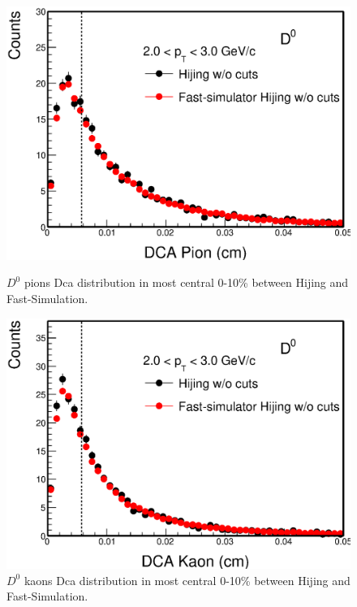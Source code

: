 \begin{figure}[htbp]
\begin{minipage}[htbp]{0.52\linewidth}
\centering
\includegraphics[width=1.0\textwidth,angle=0]{figure/Run14_D0HFT/HijingdcaPions.eps}
\caption{ $D^0$ pions Dca distribution in most central 0-10\% between Hijing and Fast-Simulation.\label{HijingdcaPions}}
\end{minipage}
\hfill
\begin{minipage}[htbp]{0.52\linewidth}
\centering
\includegraphics[width=1.0\textwidth,angle=0]{figure/Run14_D0HFT/HijingdcaKaons.eps} 
\caption{ $D^0$ kaons Dca distribution in most central 0-10\% between Hijing and Fast-Simulation.\label{HijingdcaKaons}}
\end{minipage}
\end{figure}

